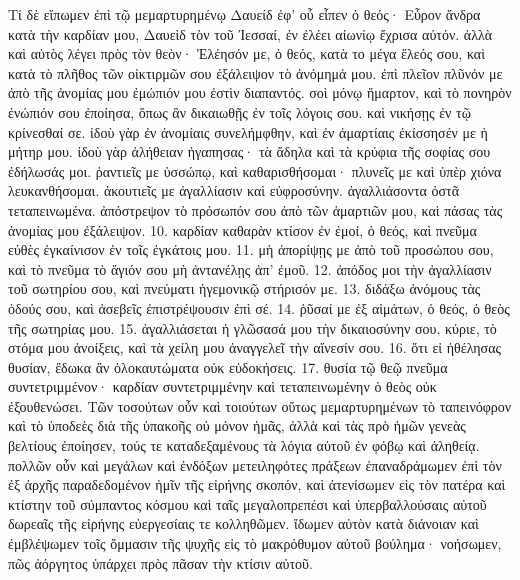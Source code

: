 Τί δὲ εἴπωμεν ἐπὶ τῷ μεμαρτυρημένῳ Δαυείδ ἐφ’ οὗ εἶπεν ὁ θεός· Εὗρον ἄνδρα κατὰ τὴν καρδίαν μου, Δαυεὶδ τὸν τοῦ Ἰεσσαί, ἐν ἐλέει αἰωνίῳ ἔχρισα αὐτόν. ἀλλὰ καὶ αὐτὸς λέγει πρὸς τὸν θεὸν· Ἐλέησόν με, ὁ θεός, κατὰ το μέγα ἔλεός σου, καὶ κατὰ τὸ πλῆθος τῶν οἰκτιρμῶν σου ἐξάλειψον τὸ ἀνόμημά μου. ἐπὶ πλεῖον πλῦνόν με ἀπὸ τῆς ἀνομίας μου ἐμώπιόν μου ἐστὶν διαπαντός. σοὶ μόνῳ ἥμαρτον, καὶ τὸ πονηρὸν ἐνώπιόν σου ἐποίησα, ὅπως ἂν δικαιωθῇς ἐν τοῖς λόγοις σου. καὶ νικήσῃς ἐν τῷ κρίνεσθαί σε. ἰδοὺ γὰρ ἐν ἀνομίαις συνελήμφθην, καὶ ἐν ἁμαρτίαις ἐκίσσησέν με ἡ μήτηρ μου. ἰδοὺ γὰρ ἀλήθειαν ἠγαπησας· τὰ ἄδηλα καὶ τὰ κρύφια τῆς σοφίας σου ἐδήλωσάς μοι. ῥαντιεῖς με ὑσσώπῳ, καὶ καθαρισθήσομαι· πλυνεῖς με καὶ ὑπὲρ χιόνα λευκανθήσομαι. ἀκουτιεῖς με ἀγαλλίασιν καὶ εὐφροσύνην. ἀγαλλιάσοντα ὀστᾶ τεταπεινωμένα. ἀπόστρεψον τὸ πρόσωπόν σου ἀπὸ τῶν ἁμαρτιῶν μου, καὶ πάσας τὰς ἀνομίας μου ἐξάλειψον. 10. καρδίαν καθαρὰν κτίσον ἐν ἐμοί, ὁ θεός, καὶ πνεῦμα εὐθὲς ἐγκαίνισον ἐν τοῖς ἐγκάτοις μου. 11. μὴ ἀπορίψῃς με ἀπὸ τοῦ προσώπου σου, καὶ τὸ πνεῦμα τὸ ἅγιόν σου μὴ ἀντανέλῃς ἀπ’ ἐμοῦ. 12. ἀπόδος μοι τὴν ἀγαλλίασιν τοῦ σωτηρίου σου, καὶ πνεύματι ἡγεμονικῷ στήρισόν με. 13. διδάξω ἀνόμους τὰς ὁδούς σου, καὶ ἀσεβεῖς ἐπιστρέψουσιν ἐπὶ σέ. 14. ῥῦσαί με ἐξ αἱμάτων, ὁ θεός, ὁ θεὸς τῆς σωτηρίας μου. 15. ἀγαλλιάσεται ἡ γλῶσασά μου τὴν δικαιοσύνην σου. κύριε, τὸ στόμα μου ἀνοίξεις, καὶ τὰ χείλη μου ἀναγγελεῖ τὴν αἴνεσίν σου. 16. ὅτι εἰ ἠθέλησας θυσίαν, ἔδωκα ἂν ὁλοκαυτώματα οὐκ εὐδοκήσεις. 17. θυσία τῷ θεῷ πνεῦμα συντετριμμένον· καρδίαν συντετριμμένην καὶ τεταπεινωμένην ὁ θεὸς οὐκ ἐξουθενώσει.
Τῶν τοσούτων οὖν καὶ τοιούτων οὕτως μεμαρτυρημένων τὸ ταπεινόφρον καὶ τὸ ὑποδεὲς διὰ τῆς ὑπακοῆς οὐ μόνον ἡμᾶς, ἀλλὰ καὶ τὰς πρὸ ἡμῶν γενεὰς βελτίους ἐποίησεν, τούς τε καταδεξαμένους τὰ λόγια αὐτοῦ ἐν φόβῳ καὶ ἀληθείᾳ. πολλῶν οὖν καὶ μεγάλων καὶ ἐνδόξων μετειληφότες πράξεων ἐπαναδράμωμεν ἐπὶ τὸν ἐξ ἀρχῆς παραδεδομένον ἡμῖν τῆς εἰρήνης σκοπόν, καὶ ἀτενίσωμεν εἰς τὸν πατέρα καὶ κτίστην τοῦ σύμπαντος κόσμου καὶ ταῖς μεγαλοπρεπέσι καὶ ὑπερβαλλούσαις αὐτοῦ δωρεαῖς τῆς εἰρήνης εὐεργεσίαις τε κολληθῶμεν. ἴδωμεν αὐτὸν κατὰ διάνοιαν καὶ ἐμβλέψωμεν τοῖς ὄμμασιν τῆς ψυχῆς εἰς τὸ μακρόθυμον αὐτοῦ βούλημα· νοήσωμεν, πῶς ἀόργητος ὑπάρχει πρὸς πᾶσαν τὴν κτίσιν αὐτοῦ.
